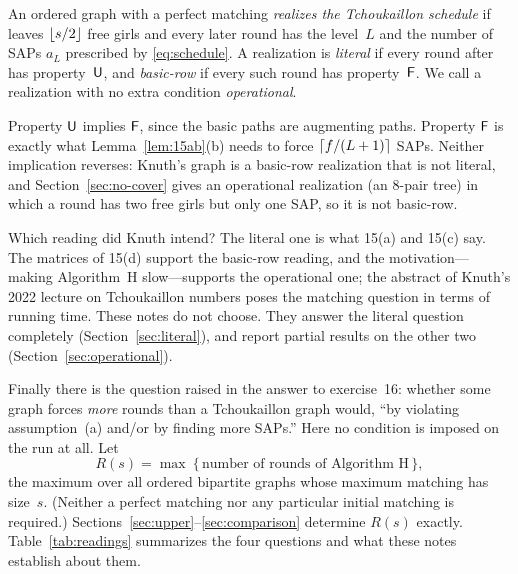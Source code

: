 \begin{definition}
An ordered graph with a perfect matching \emph{realizes the Tchoukaillon
schedule} if~ leaves $\lfloor s/2\rfloor$ free girls and every later round
has the level~$L$ and the number of SAPs $a_L$ prescribed by
\eqref{eq:schedule}. A realization is \emph{literal} if every round after
 has property~$\mathsf U$, and \emph{basic-row} if every such round has
property~$\mathsf F$. We call a realization with no extra condition
\emph{operational}.
\end{definition}

Property $\mathsf U$ implies $\mathsf F$, since the basic paths are augmenting paths.
Property $\mathsf F$ is exactly what Lemma~\ref{lem:15ab}(b) needs to force
$\lceil f/(L+1)\rceil$ SAPs. Neither implication reverses: Knuth's graph is a
basic-row realization that is not literal, and Section~\ref{sec:no-cover}
gives an operational realization (an 8-pair tree) in which a round has
two free girls but only one SAP, so it is not basic-row.

Which reading did Knuth intend? The literal one is what 15(a) and 15(c)
say. The matrices of 15(d) support the basic-row reading, and the
motivation---making Algorithm~H slow---supports the operational one;
the abstract of Knuth's 2022 lecture on Tchoukaillon numbers
\cite{KnuthRutgers} poses the matching question in terms of running
time. These notes do not choose. They answer the literal question
completely (Section~\ref{sec:literal}), and report partial results on the
other two (Section~\ref{sec:operational}).

Finally there is the question raised in the answer to exercise~16:
whether some graph forces \emph{more} rounds than a Tchoukaillon graph
would, ``by violating assumption~(a) and/or by finding more SAPs.'' Here
no condition is imposed on the run at all. Let
\[
  R(s)=\max\ \{\,\text{number of rounds of Algorithm~H}\,\},
\]
the maximum over all ordered bipartite graphs whose maximum matching has
size~$s$. (Neither a perfect matching nor any particular initial
matching is required.) Sections~\ref{sec:upper}--\ref{sec:comparison}
determine $R(s)$ exactly. Table~\ref{tab:readings} summarizes the
four questions and what these notes establish about them.

